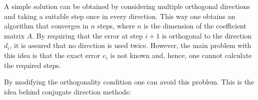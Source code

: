     A simple solution can be obtained by considering multiple orthogonal directions and taking a suitable step once in every direction. This way one obtains an algorithm that converges in $n$ steps, where $n$ is the dimension of the coefficient matrix $A$. By requiring that the error at step $i+1$ is orthogonal to the direction $d_i$, it is assured that no direction is used twice. However, the main problem with this idea is that the exact error $e_i$ is not known and, hence, one cannot calculate the required steps.

    By modifying the orthogonality condition one can avoid this problem. This is the idea behind conjugate direction methods:

